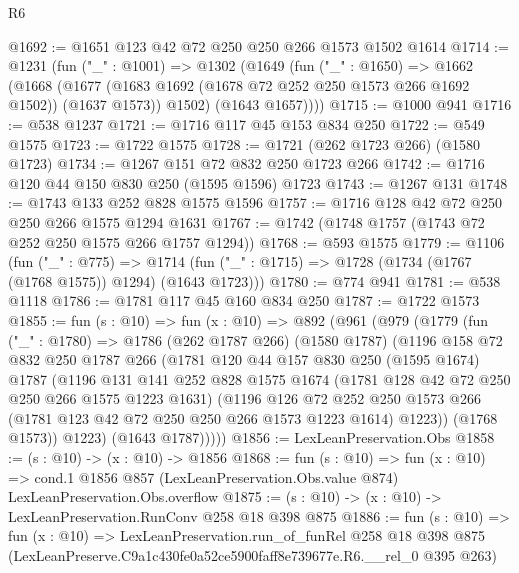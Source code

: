 \begin{lexlean}{R6}
\begin{coremodule}
@1692 := @1651 @123 @42 @72 @250 @250 @266 @1573 @1502 @1614
@1714 := @1231
    (fun ("_" : @1001) =>
    @1302
      (@1649
        (fun ("_" : @1650) =>
        @1662
          (@1668
            (@1677 (@1683 @1692 (@1678 @72 @252 @250 @1573 @266 @1692 @1502)) (@1637 @1573))
            @1502)
          (@1643 @1657))))
@1715 := @1000 @941
@1716 := @538 @1237
@1721 := @1716 @117 @45 @153 @834 @250
@1722 := @549 @1575
@1723 := @1722 @1575
@1728 := @1721 (@262 @1723 @266) (@1580 @1723)
@1734 := @1267 @151 @72 @832 @250 @1723 @266
@1742 := @1716 @120 @44 @150 @830 @250 (@1595 @1596) @1723
@1743 := @1267 @131
@1748 := @1743 @133 @252 @828 @1575 @1596
@1757 := @1716 @128 @42 @72 @250 @250 @266 @1575 @1294 @1631
@1767 := @1742 (@1748 @1757 (@1743 @72 @252 @250 @1575 @266 @1757 @1294))
@1768 := @593 @1575
@1779 := @1106
    (fun ("_" : @775) =>
    @1714 (fun ("_" : @1715) => @1728 (@1734 (@1767 (@1768 @1575)) @1294) (@1643 @1723)))
@1780 := @774 @941
@1781 := @538 @1118
@1786 := @1781 @117 @45 @160 @834 @250
@1787 := @1722 @1573
@1855 := fun (s : @10) =>
  fun (x : @10) =>
  @892
    (@961
      (@979
        (@1779
          (fun ("_" : @1780) =>
          @1786
            (@262 @1787 @266)
            (@1580 @1787)
            (@1196
              @158
              @72
              @832
              @250
              @1787
              @266
              (@1781
                @120
                @44
                @157
                @830
                @250
                (@1595 @1674)
                @1787
                (@1196
                  @131
                  @141
                  @252
                  @828
                  @1575
                  @1674
                  (@1781 @128 @42 @72 @250 @250 @266 @1575 @1223 @1631)
                  (@1196
                    @126
                    @72
                    @252
                    @250
                    @1573
                    @266
                    (@1781 @123 @42 @72 @250 @250 @266 @1573 @1223 @1614)
                    @1223))
                (@1768 @1573))
              @1223)
            (@1643 @1787)))))
@1856 := LexLeanPreservation.Obs
@1858 := (s : @10) -> (x : @10) -> @1856
@1868 := fun (s : @10) =>
  fun (x : @10) =>
  cond.{1} @1856 @857 (LexLeanPreservation.Obs.value @874) LexLeanPreservation.Obs.overflow
@1875 := (s : @10) -> (x : @10) -> LexLeanPreservation.RunConv @258 @18 @398 @875
@1886 := fun (s : @10) =>
  fun (x : @10) =>
  LexLeanPreservation.run_of_funRel
    @258
    @18
    @398
    @875
    (LexLeanPreserve.C9a1c430fe0a52ce5900faff8e739677e.R6.__rel_0 @395 @263)
\end{coremodule}
\end{lexlean}
